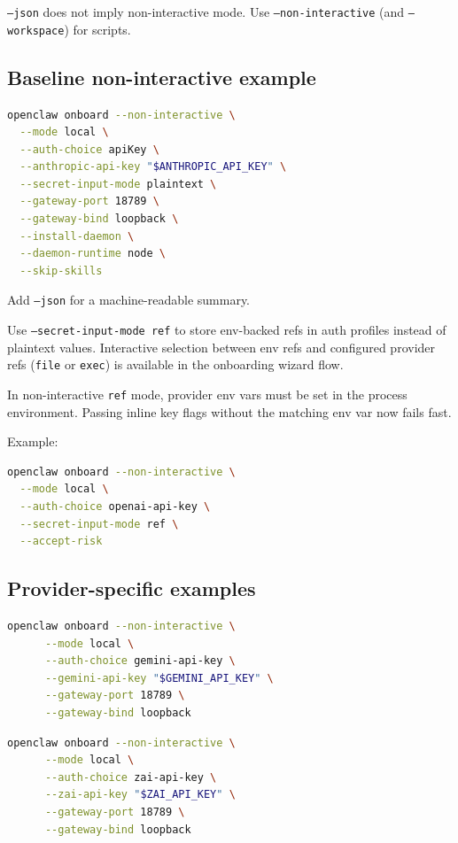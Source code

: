 \texttt{--json} does not imply non-interactive mode. Use \texttt{--non-interactive} (and \texttt{--workspace}) for scripts.

\subsection{Baseline non-interactive example}


\begin{lstlisting}[language=bash]
openclaw onboard --non-interactive \
  --mode local \
  --auth-choice apiKey \
  --anthropic-api-key "$ANTHROPIC_API_KEY" \
  --secret-input-mode plaintext \
  --gateway-port 18789 \
  --gateway-bind loopback \
  --install-daemon \
  --daemon-runtime node \
  --skip-skills
\end{lstlisting}


Add \texttt{--json} for a machine-readable summary.

Use \texttt{--secret-input-mode ref} to store env-backed refs in auth profiles instead of plaintext values.
Interactive selection between env refs and configured provider refs (\texttt{file} or \texttt{exec}) is available in the onboarding wizard flow.

In non-interactive \texttt{ref} mode, provider env vars must be set in the process environment.
Passing inline key flags without the matching env var now fails fast.

Example:

\begin{lstlisting}[language=bash]
openclaw onboard --non-interactive \
  --mode local \
  --auth-choice openai-api-key \
  --secret-input-mode ref \
  --accept-risk
\end{lstlisting}


\subsection{Provider-specific examples}


\begin{lstlisting}[language=bash]
    openclaw onboard --non-interactive \
      --mode local \
      --auth-choice gemini-api-key \
      --gemini-api-key "$GEMINI_API_KEY" \
      --gateway-port 18789 \
      --gateway-bind loopback
\end{lstlisting}

\begin{lstlisting}[language=bash]
    openclaw onboard --non-interactive \
      --mode local \
      --auth-choice zai-api-key \
      --zai-api-key "$ZAI_API_KEY" \
      --gateway-port 18789 \
      --gateway-bind loopback
\end{lstlisting}

